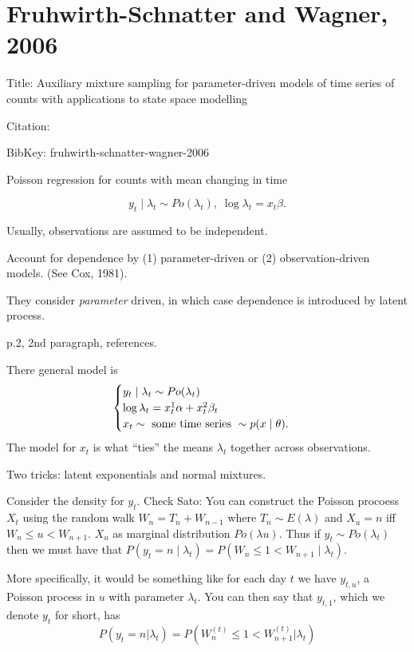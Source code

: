 \documentclass{article}
\begin{document}
\section{Fruhwirth-Schnatter and Wagner, 2006}

Title: Auxiliary mixture sampling for parameter-driven models of time series of counts
with applications to state space modelling

Citation: \cite{fruhwirth-schnatter-wagner-2006}

BibKey: fruhwirth-schnatter-wagner-2006

\begin{outline}

\1 Poisson regression for counts with mean changing in time

\[
y_t \mid \lambda_t \sim Po(\lambda_t), \; \log \lambda_t = x_t \beta.
\]

  \2 Usually, observations are assumed to be independent.

  \2 Account for dependence by (1) parameter-driven or (2) observation-driven
  models.  (See Cox, 1981).

  \2 They consider \emph{parameter} driven, in which case dependence is
  introduced by latent process.

\1 p.2, 2nd paragraph, references.

\1 There general model is
\[
\begin{cases}
y_t \mid \lambda_t \sim Po(\lambda_t) \\
\log \lambda_t = x_t^1 \alpha + x_t^2 \beta_t \\
x_t \sim \textmd{ some time series } \sim p(x\mid\theta).
\end{cases}
\]
The model for $x_t$ is what ``ties'' the means $\lambda_t$ together across
observations.

  \2 Two tricks: latent exponentials and normal mixtures.

  Consider the density for $y_t$.  Check Sato: You can construct the Poisson procoess
  $X_t$ using the random walk $W_n = T_n + W_{n-1}$ where $T_n \sim E(\lambda)$
  and $X_u = n$ iff $W_n \leq u < W_{n+1}$.  $X_u$ as marginal distribution
  $Po(\lambda u)$.  Thus if $y_t \sim Po(\lambda_t)$ then we must have that
  $P(y_t = n \mid \lambda_t) = P(W_{n} \leq 1 < W_{n+1} \mid \lambda_t)$.

  More specifically, it would be something like for each day $t$ we have
  $y_{t,u}$, a Poisson process in $u$ with parameter $\lambda_t$.  You can then
  say that $y_{t,1}$, which we denote $y_{t}$ for short, has
  \[
  P(y_t = n | \lambda_t) = P(W_{n}^{(t)} \leq 1 < W_{n+1}^{(t)} | \lambda_t)
  \]


\end{outline}
\end{document}

